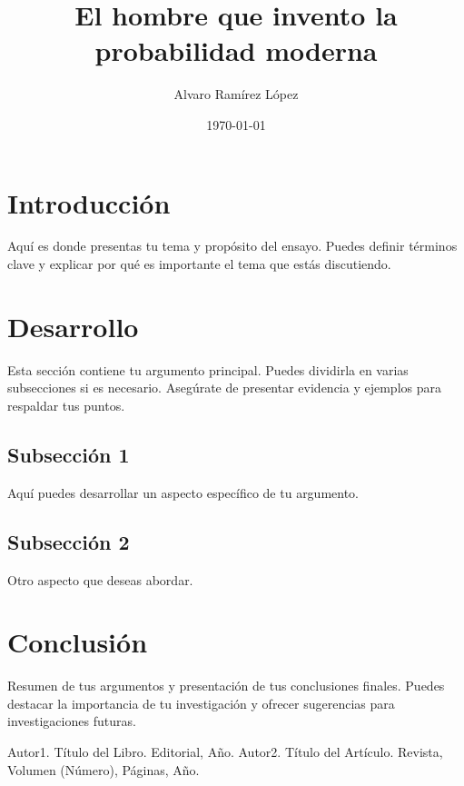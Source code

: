 \documentclass[a4paper, 12pt]{article}
\title{El hombre que invento la probabilidad moderna}
\author{Alvaro Ramírez López}
\date{\today} %
\begin{document}
\maketitle

\section{Introducción}
Aquí es donde presentas tu tema y propósito del ensayo. Puedes definir términos clave y explicar por qué es importante el tema que estás discutiendo.

\section{Desarrollo}
Esta sección contiene tu argumento principal. Puedes dividirla en varias subsecciones si es necesario. Asegúrate de presentar evidencia y ejemplos para respaldar tus puntos.

\subsection{Subsección 1}
Aquí puedes desarrollar un aspecto específico de tu argumento.

\subsection{Subsección 2}
Otro aspecto que deseas abordar.

\section{Conclusión}
Resumen de tus argumentos y presentación de tus conclusiones finales. Puedes destacar la importancia de tu investigación y ofrecer sugerencias para investigaciones futuras.

\begin{thebibliography}{}
 Autor1. Título del Libro. Editorial, Año.
 Autor2. Título del Artículo. Revista, Volumen (Número), Páginas, Año.
\end{thebibliography}
\end{document}
